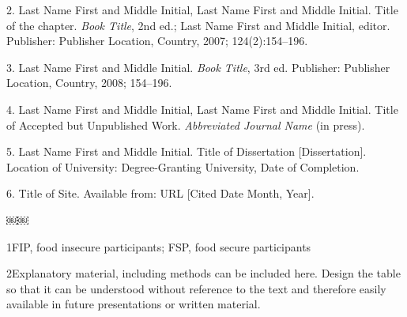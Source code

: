 \documentclass[conference]{IEEEtran}
\begin{document}
2. Last Name  First and Middle Initial, Last Name  First and Middle Initial. Title of the chapter. \textit{Book Title}, 2nd ed.; Last Name  First and Middle Initial, editor. Publisher: Publisher Location, Country, 2007; 124(2):154--196.

3. Last Name  First and Middle Initial. \textit{Book Title}, 3rd ed. Publisher: Publisher Location, Country, 2008; 154--196. 

4. Last Name  First and Middle Initial, Last Name  First and Middle Initial. Title of Accepted but Unpublished Work. \textit{Abbreviated Journal Name} (in press).

5. Last Name  First and Middle Initial. Title of Dissertation [Dissertation]. Location of University: Degree-Granting University, Date of Completion. 

6. Title of Site. Available from: URL [Cited Date Month, Year].

￼￼

\begin{table}[H]
  \centering
  \caption{Title that that clearly but concisely describes the treatments and experimental cells, animals, or participants.}
  \label{tab:bang1}
\end{table}

  1FIP, food insecure participants; FSP, food secure participants

2Explanatory material, including methods can be included here. Design the table so that it can be understood without reference to the text and therefore easily available in future presentations or written material.
\end{document}
